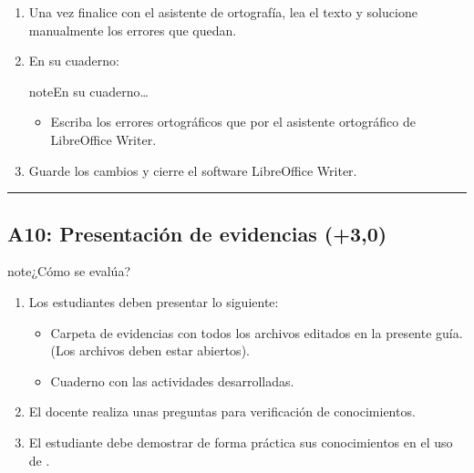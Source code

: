 \documentclass[letterpaper,10pt,spanish]{sphinxmanual}
\begin{document}
\begin{enumerate}
\item {} 
\sphinxAtStartPar
Una vez finalice con el asistente de ortografía, lea el texto y solucione manualmente los errores que quedan.

\item {} 
\sphinxAtStartPar
En su cuaderno:

\begin{sphinxadmonition}{note}{En su cuaderno…}
\begin{itemize}
\item {} 
\sphinxAtStartPar
Escriba los errores ortográficos que  por el asistente ortográfico de LibreOffice Writer.

\end{itemize}
\end{sphinxadmonition}

\item {} 
\sphinxAtStartPar
Guarde los cambios y cierre el software LibreOffice Writer.

\end{enumerate}


\bigskip\hrule\bigskip



\subsection{A10: Presentación de evidencias (+3,0)}
\label{\detokenize{1_guias/10ofimatica/G1013:a10-presentacion-de-evidencias-3-0}}
\sphinxAtStartPar
{}

\begin{sphinxadmonition}{note}{¿Cómo se evalúa?}
\begin{enumerate}
%
\item {} 
\sphinxAtStartPar
Los estudiantes deben presentar lo siguiente:
\begin{itemize}
\item {} 
\sphinxAtStartPar
Carpeta de evidencias con todos los archivos editados en la presente guía. (Los archivos deben estar abiertos).

\item {} 
\sphinxAtStartPar
Cuaderno con las actividades desarrolladas.

\end{itemize}

\item {} 
\sphinxAtStartPar
El docente realiza unas preguntas para verificación de conocimientos.

\item {} 
\sphinxAtStartPar
El estudiante debe demostrar de forma práctica sus conocimientos en el uso de .

\end{enumerate}
\end{sphinxadmonition}
\end{document}
